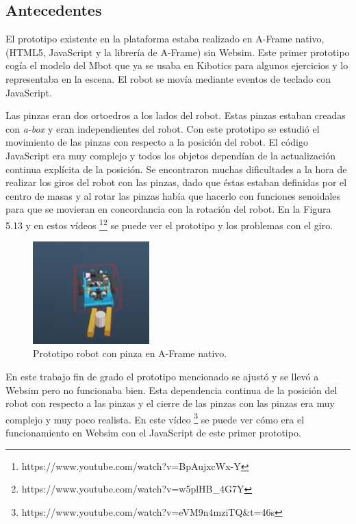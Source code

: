 \subsection{Antecedentes}
El prototipo existente en la plataforma estaba realizado en A-Frame nativo, (HTML5, JavaScript y la librería de A-Frame) sin Websim. Este primer prototipo cogía el modelo del Mbot que ya se usaba en Kibotics para algunos ejercicios y lo representaba en la escena. El robot se movía mediante eventos de teclado con JavaScript. 

Las pinzas eran dos ortoedros a los lados del robot. Estas pinzas estaban creadas con \textit{a-box} y eran  independientes del robot. Con este prototipo se estudió el movimiento de las pinzas con respecto a la posición del robot. El código JavaScript era muy complejo y todos los objetos dependían de la actualización continua explícita de la posición. 
Se encontraron muchas dificultades a la hora de realizar los giros del robot con las pinzas, dado que éstas estaban definidas por el centro de masas y al rotar las pinzas había que hacerlo con funciones senoidales para que se movieran en concordancia con la rotación del robot. En la Figura 5.13 y en estos vídeos \footnote{https://www.youtube.com/watch?v=BpAujxcWx-Y}\footnote{https://www.youtube.com/watch?v=w5plHB\_4G7Y} se puede ver el prototipo y los problemas con el giro.

 \begin{figure}[H]
  \centering
 \includegraphics[width=0.40\textwidth]{chapters/images/prototipo.png}
  \caption{Prototipo robot con pinza en A-Frame nativo.}
\end{figure}

En este trabajo fin de grado el prototipo mencionado se ajustó y se llevó a Websim pero no funcionaba bien. Esta dependencia continua de la posición del robot con respecto a las pinzas y  el cierre de las pinzas con las pinzas era muy complejo y muy poco realista. En este vídeo  \footnote{https://www.youtube.com/watch?v=eVM9n4mziTQ\&t=46s} se puede ver cómo era el funcionamiento en Websim con el JavaScript de este primer prototipo.  


